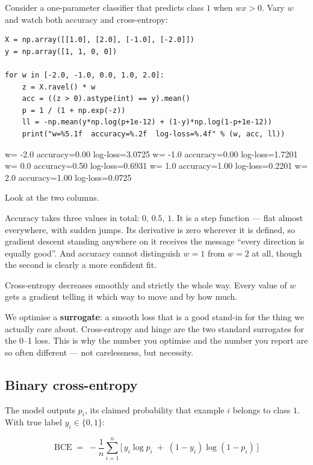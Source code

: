 \documentclass[11pt]{article}
\begin{document}
Consider a one-parameter classifier that predicts class $1$ when $wx > 0$. Vary
$w$ and watch both accuracy and cross-entropy:

\begin{lstlisting}
X = np.array([[1.0], [2.0], [-1.0], [-2.0]])
y = np.array([1, 1, 0, 0])

for w in [-2.0, -1.0, 0.0, 1.0, 2.0]:
    z = X.ravel() * w
    acc = ((z > 0).astype(int) == y).mean()
    p = 1 / (1 + np.exp(-z))
    ll = -np.mean(y*np.log(p+1e-12) + (1-y)*np.log(1-p+1e-12))
    print("w=%5.1f  accuracy=%.2f  log-loss=%.4f" % (w, acc, ll))
\end{lstlisting}
\begin{codeout}
w= -2.0  accuracy=0.00  log-loss=3.0725
w= -1.0  accuracy=0.00  log-loss=1.7201
w=  0.0  accuracy=0.50  log-loss=0.6931
w=  1.0  accuracy=1.00  log-loss=0.2201
w=  2.0  accuracy=1.00  log-loss=0.0725
\end{codeout}

Look at the two columns.

Accuracy takes three values in total: $0$, $0.5$, $1$. It is a step function ---
flat almost everywhere, with sudden jumps. Its derivative is zero wherever it
is defined, so gradient descent standing anywhere on it receives the message
``every direction is equally good''. And accuracy cannot distinguish $w=1$ from
$w=2$ at all, though the second is clearly a more confident fit.

Cross-entropy decreases smoothly and strictly the whole way. Every value of $w$
gets a gradient telling it which way to move and by how much.

\begin{keyidea}
We optimise a \textbf{surrogate}: a smooth loss that is a good stand-in for the
thing we actually care about. Cross-entropy and hinge are the two standard
surrogates for the 0--1 loss. This is why the number you optimise and the
number you report are so often different --- not carelessness, but necessity.
\end{keyidea}

\subsection{Binary cross-entropy}

The model outputs $p_i$, its claimed probability that example $i$ belongs to
class $1$. With true label $y_i \in \{0,1\}$:

\[
  \mathrm{BCE} \;=\; -\frac{1}{n}\sum_{i=1}^{n}
    \Big[\, y_i \log p_i \;+\; (1-y_i)\log(1-p_i) \,\Big]
\]
\end{document}
